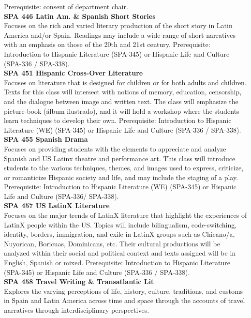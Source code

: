 \documentclass[
  letterpaper,
]{scrbook}
\begin{document}
Prerequisite: consent of department chair.\\
\textbf{SPA 446 Latin Am. \& Spanish Short Stories}\\
Focuses on the rich and varied literary production of the short story in
Latin America and/or Spain. Readings may include a wide range of short
narratives with an emphasis on those of the 20th and 21st century.
Prerequisite: Introduction to Hispanic Literature (SPA-345) or Hispanic
Life and Culture (SPA-336 / SPA-338).\\
\textbf{SPA 451 Hispanic Cross-Over Literature}\\
Focuses on literature that is designed for children or for both adults
and children. Texts for this class will intersect with notions of
memory, education, censorship, and the dialogue between image and
written text. The class will emphasize the picture-book (álbum
ilustrado), and it will hold a workshop where the students learn
techniques to develop their own. Prerequisite: Introduction to Hispanic
Literature (WE) (SPA-345) or Hispanic Life and Culture (SPA-336 /
SPA-338).\\
\textbf{SPA 455 Spanish Drama}\\
Focuses on providing students with the elements to appreciate and
analyze Spanish and US Latinx theatre and performance art. This class
will introduce students to the various techniques, themes, and images
used to express, criticize, or romanticize Hispanic society and life,
and may include the staging of a play. Prerequisite: Introduction to
Hispanic Literature (WE) (SPA-345) or Hispanic Life and Culture
(SPA-336/ SPA-338).\\
\textbf{SPA 457 US LatinX Literature}\\
Focuses on the major trends of LatinX literature that highlight the
experiences of LatinX people within the US. Topics will include
bilingualism, code-switching, identity, borders, immigration, and exile
in LatinX groups such as Chicano/a, Nuyorican, Boricuas, Dominicans,
etc. Their cultural productions will be analyzed within their social and
political context and texts assigned will be in English, Spanish or
mixed. Prerequisite: Introduction to Hispanic Literature (SPA-345) or
Hispanic Life and Culture (SPA-336 / SPA-338).\\
\textbf{SPA 458 Travel Writing \& Transatlantic Lit}\\
Explores the varying perceptions of life, history, culture, traditions,
and customs in Spain and Latin America across time and space through the
accounts of travel narratives through interdisciplinary perspectives.
\end{document}
